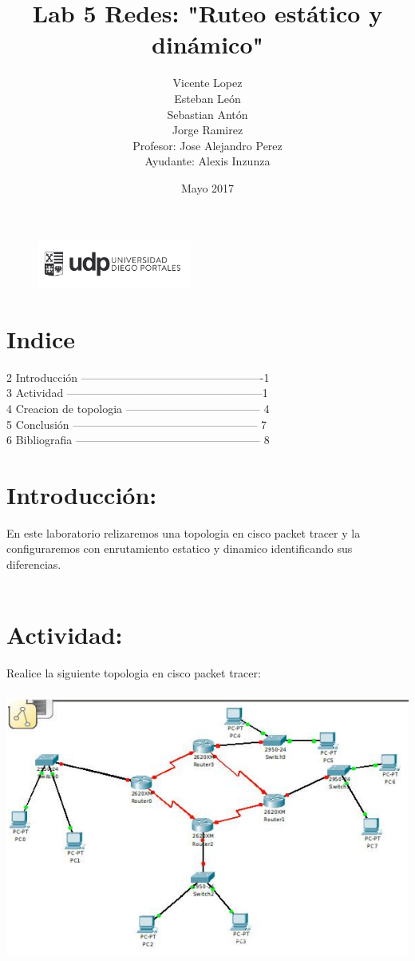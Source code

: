 \documentclass{article}
\title{Lab 5 Redes: "Ruteo estático y dinámico"}
\author{Vicente Lopez\\Esteban León\\Sebastian Antón\\Jorge Ramirez\\Profesor: Jose Alejandro Perez\\Ayudante: Alexis Inzunza}
\date{Mayo 2017}
\begin{document}
\begin{figure}[h]
\includegraphics[width=0.45\textwidth]{logo_udp.png}
\maketitle
\end{figure}

\section{Indice}
2 Introducción -------------------------------------------------1\\
3 Actividad -----------------------------------------------------1\\
4 Creacion de topologia ------------------------------------ 4\\
5 Conclusión -------------------------------------------------- 7\\
6 Bibliografia -------------------------------------------------- 8\\

\section{Introducción:}
En este laboratorio relizaremos una topologia en cisco packet tracer y la configuraremos con enrutamiento estatico y dinamico identificando sus diferencias.\\\\

\section{Actividad:}
Realice la siguiente topologia en cisco packet tracer:\\\\

\includegraphics[scale=0.5]{top.png}\\\\
\end{document}
